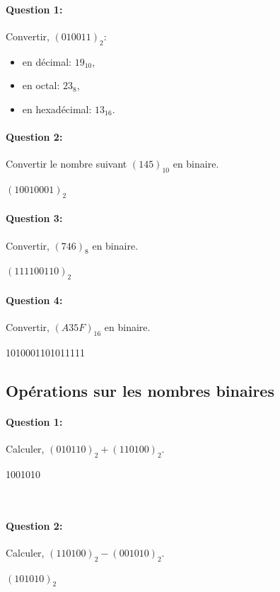 \paragraph{Question 1:}

Convertir, $(010011)_{2}$:
\begin{itemize}
 \item en décimal: $19_{10}$,
 \item en octal: $23_{8}$,
 \item en hexadécimal: $13_{16}$.
\end{itemize}

\paragraph{Question 2:}

Convertir le nombre suivant $(145)_{10}$ en binaire.

$(10010001)_{2}$

\paragraph{Question 3:} Convertir, $(746)_{8}$ en binaire.

$(111100110)_{2}$

\paragraph{Question 4:} Convertir, $(A35F)_{16}$ en binaire.

1010001101011111

\subsection{Opérations sur les nombres binaires}

\paragraph{Question 1:}

Calculer, $(010110)_{2}+(110100)_{2}$.

1001010

~\

\paragraph{Question 2:}

Calculer, $(110100)_{2}-(001010)_{2}$.

$(101010)_{2}$

